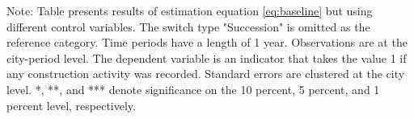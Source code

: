 \begin{table}[htbp]
\begin{tabular}{lcccc}
      
   \end{tabular}
   
   \par \raggedright 
   Note: Table presents results of estimation equation \eqref{eq:baseline} but using different control variables. The switch type  "Succession" is omitted as the reference category. Time periods have a length of 1 year. Observations are at the city-period level. The dependent variable is an  indicator that takes the value 1 if any construction activity was recorded.  Standard errors are clustered at the city level. *, **, and *** denote significance on the 10 percent, 5 percent, and 1 percent  level, respectively.
\end{table}
